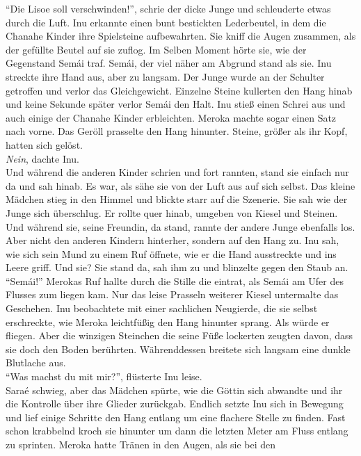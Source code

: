 \documentclass[a4paper,12pt]{book}
\begin{document}
``Die Lisoe soll verschwinden!'', schrie der dicke Junge und schleuderte etwas durch die Luft. Inu 
erkannte einen bunt bestickten Lederbeutel, in dem die Chanahe Kinder ihre Spielsteine 
aufbewahrten. Sie kniff die Augen zusammen, als der gefüllte Beutel auf sie zuflog. Im Selben 
Moment hörte sie, wie der Gegenstand Semái traf. Semái, der viel näher am Abgrund stand als sie. 
Inu streckte ihre Hand aus, aber zu langsam. Der Junge wurde an der Schulter getroffen und verlor 
das Gleichgewicht. Einzelne Steine kullerten den Hang hinab und keine Sekunde später  verlor Semái 
den Halt. Inu stieß einen Schrei aus und auch einige der Chanahe Kinder erbleichten. Meroka machte 
sogar einen Satz nach vorne.  Das Geröll prasselte den Hang hinunter. Steine, größer als ihr Kopf, 
hatten sich gelöst.\\
\textit{Nein}, dachte Inu.\\
Und während die anderen Kinder schrien und fort rannten, stand sie einfach nur da und sah hinab. Es 
war, als sähe sie von der Luft aus auf sich selbst. Das kleine Mädchen stieg in den Himmel und 
blickte starr auf die Szenerie. Sie sah wie der Junge sich überschlug. Er rollte quer hinab, 
umgeben von Kiesel und Steinen. Und während sie, seine Freundin, da stand, rannte der andere Junge 
ebenfalls los. Aber nicht den anderen Kindern hinterher, sondern auf den Hang zu. Inu sah, wie sich 
sein Mund zu einem Ruf öffnete, wie er die Hand ausstreckte und ins Leere griff. Und sie? Sie stand 
da, sah ihm zu und blinzelte gegen den Staub an. \\
``Semái!'' Merokas Ruf hallte durch die Stille die eintrat, als Semái am Ufer des Flusses zum 
liegen kam. Nur das leise Prasseln weiterer Kiesel untermalte das Geschehen. Inu beobachtete mit 
einer sachlichen Neugierde, die sie selbst erschreckte, wie Meroka leichtfüßig den Hang hinunter 
sprang. Als würde er fliegen. Aber die winzigen Steinchen die seine Füße lockerten zeugten davon, 
dass sie doch den Boden berührten. Währenddessen breitete sich langsam eine dunkle Blutlache aus. \\
``Was machst du mit mir?'', flüsterte Inu leise.\\
Saraé schwieg, aber das Mädchen spürte, wie die Göttin sich abwandte und ihr die Kontrolle über 
ihre Glieder zurückgab. Endlich setzte Inu sich in Bewegung und lief einige Schritte den Hang 
entlang um eine flachere Stelle zu finden. Fast schon krabbelnd kroch sie hinunter um dann die 
letzten Meter am Fluss entlang zu sprinten. Meroka hatte Tränen in den Augen, als sie bei den 
\end{document}
